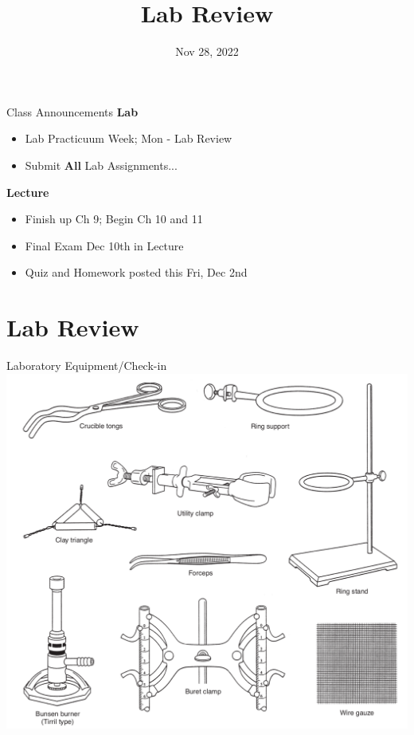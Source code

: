 \documentclass[11pt]{beamer}
\title{Lab Review}
\institute{Chemistry Department, Cypress College}
\date{Nov 28, 2022}
\begin{document}
\begin{frame}
  \titlepage
\end{frame}

\begin{frame}{Class Announcements}
  \textbf{Lab}
  \begin{itemize}
  \item Lab Practicuum Week; Mon - Lab Review
  \item Submit \textbf{All} Lab Assignments...
  \end{itemize}

  \textbf{Lecture}
  \begin{itemize}
  \item Finish up Ch 9; Begin Ch 10 and 11
  \item Final Exam Dec 10th in Lecture
  \item Quiz and Homework posted this Fri, Dec 2nd
  \end{itemize}
\end{frame}

\section{Lab Review}

\begin{frame}{Laboratory Equipment/Check-in}
  \centering
  \includegraphics[width=0.8\linewidth]{equip_lab}
\end{frame}
\end{document}
